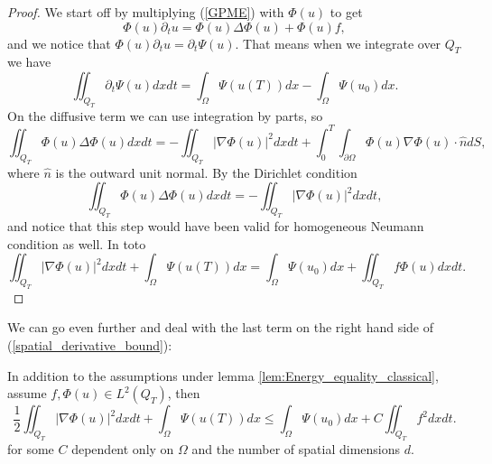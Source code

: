 \documentclass[11pt, a4paper]{article}
\begin{document}
\begin{proof}
We start off by multiplying (\ref{GPME}) with $\Phi(u)$ to get
\begin{equation*}
\Phi(u)\partial_t u = \Phi(u)\Delta \Phi(u) + \Phi(u)f,
\end{equation*}
and we notice that $\Phi(u)\partial_t u = \partial_t \Psi(u)$. That means when we integrate over $Q_T$ we have
\begin{equation*}
\iint_{Q_T} \partial_t \Psi(u)dxdt = \int_\Omega \Psi(u(T))dx - \int_\Omega \Psi(u_0)dx.
\end{equation*}
On the diffusive term we can use integration by parts, so
\begin{equation*}
\iint_{Q_T}\Phi(u) \Delta \Phi(u) dxdt = -\iint_{Q_T} |\nabla \Phi(u)|^2dxdt + \int_0^T \int_{\partial\Omega} \Phi(u)\nabla \Phi(u) \cdot \hat{n}dS,
\end{equation*}
where $\hat{n}$ is the outward unit normal. By the Dirichlet condition
\begin{equation*}
\iint_{Q_T}\Phi(u) \Delta \Phi(u) dxdt = -\iint_{Q_T} |\nabla \Phi(u)|^2dxdt,
\end{equation*}
and notice that this step would have been valid for homogeneous Neumann condition as well. In toto 
\begin{equation*}
\iint_{Q_T} |\nabla \Phi(u)|^2dxdt + \int_\Omega \Psi(u(T))dx = \int_\Omega \Psi(u_0)dx + \iint_{Q_T} f\Phi(u)dxdt.
\end{equation*}
\end{proof}
\setcounter{obs}{0}

We can go even further and deal with the last term on the right hand side of (\ref{spatial_derivative_bound}):

\begin{cor}
\label{cor:spatial_bound_w_poincare}
In addition to the assumptions under lemma \ref{lem:Energy_equality_classical}, assume $f,\Phi(u) \in L^2(Q_T)$, then
\begin{equation}
\label{spatial_derivative_bound_w_poincare}
\frac{1}{2}\iint_{Q_T}|\nabla \Phi(u)|^2dxdt + \int_\Omega \Psi(u(T))dx \leq \int_\Omega \Psi(u_0)dx + C\iint_{Q_T}f^2dxdt.
\end{equation}
for some $C$ dependent only on $\Omega$ and the number of spatial dimensions $d$.
\end{cor}
\end{document}

